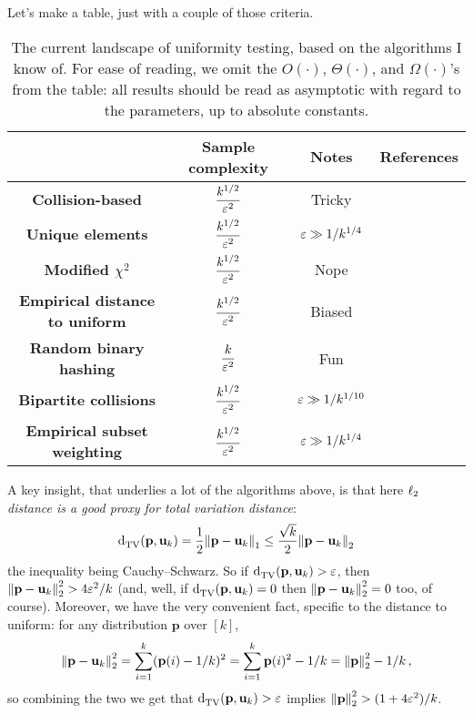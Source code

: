 \documentclass[10pt]{article}
\newcommand{\dst}{\eps}
\newcommand{\ab}{k}
\newcommand{\p}{\mathbf{p}}
\renewcommand{\uniform}{\mathbf{u}}
\begin{document}
\noindent Let's make a table, just with a couple of those criteria.
\begin{table}[H]\centering
  \def\arraystretch{2.75}%
  \begin{tabular}{|c|c|c|c|}
  \hline
     & \bf Sample complexity & \bf Notes & \bf References \\\hline
    \bf Collision-based & $\dfrac{\ab^{1/2}}{\dst^2}$ & Tricky & \cite{GoldreichR00,DiakonikolasGPP19} \\\hline
    \bf Unique elements & $\dfrac{\ab^{1/2}}{\dst^2}$ & $\dst \gg 1/\ab^{1/4}$ & \cite{Paninski08} \\\hline
    \bf Modified $\chi^2$ & $\dfrac{\ab^{1/2}}{\dst^2}$ & Nope & \cite{ValiantV17,AcharyaDK15,DiakonikolasKN15} \\\hline
    \bf Empirical distance to uniform & $\dfrac{\ab^{1/2}}{\dst^2}$ & Biased & \cite{DiakonikolasGPP18} \\\hline
    \bf Random binary hashing & $\dfrac{\ab}{\dst^2}$ & Fun & \cite{AcharyaCT19b} \\\hline
    \bf Bipartite collisions & $\dfrac{\ab^{1/2}}{\dst^2}$ & $\dst \gg 1/\ab^{1/10}$ & \cite{DiakonikolasGKR19} \\\hline
    \bf Empirical subset weighting & $\dfrac{\ab^{1/2}}{\dst^2}$ & $\dst \gg 1/\ab^{1/4}$ &  \\\hline
  \end{tabular}
  \caption{The current landscape of uniformity testing, based on the algorithms I know of. For ease of reading, we omit the $O(\cdot)$, $\Theta(\cdot)$, and $\Omega(\cdot)$'s from the table: all results should be read as asymptotic with regard to the parameters, up to absolute constants.}
\end{table}

A key insight, that underlies a lot of the algorithms above, is that here \emph{$\lp[2]$ distance is a good proxy for total variation distance}:
\begin{equation}
  \totalvardist{\p}{\uniform_k} = \frac{1}{2}\normone{\p-\uniform_\ab} \leq \frac{\sqrt{\ab}}{2}\normtwo{\p-\uniform_\ab}
\end{equation}
the inequality being Cauchy--Schwarz. So if $\totalvardist{\p}{\uniform_k}>\dst$, then $\normtwo{\p-\uniform_\ab}^2 > 4\dst^2/\ab$ (and, well, if $\totalvardist{\p}{\uniform_k}=0$ then $\normtwo{\p-\uniform_\ab}^2=0$ too, of course). Moreover, we have the very convenient fact, specific to the distance to uniform: for any distribution $\p$ over $[\ab]$,
\begin{equation}
  \normtwo{\p-\uniform_\ab}^2 = \sum_{i=1}^\ab (\p(i)-1/\ab)^2  = \sum_{i=1}^\ab \p(i)^2-1/\ab = \normtwo{\p}^2-1/\ab\,,
\end{equation}
so combining the two we get that $\totalvardist{\p}{\uniform_k}>\dst$ implies $\normtwo{\p}^2 > (1+4\dst^2)/\ab$.
\end{document}

